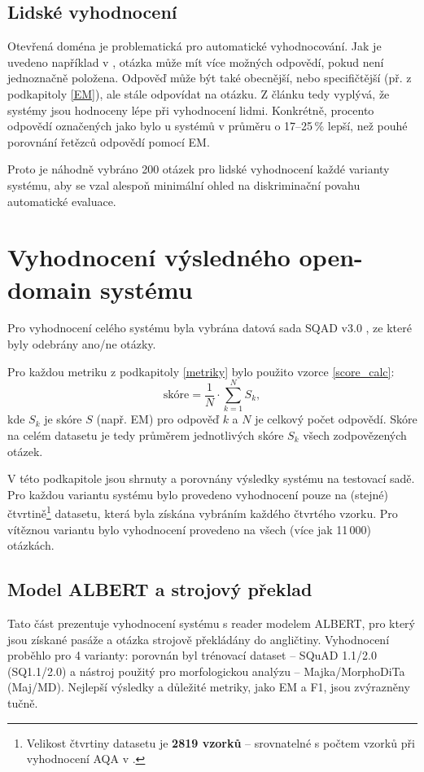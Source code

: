 \subsection{Lidské vyhodnocení}
Otevřená doména je problematická pro automatické vyhodnocování. Jak je uvedeno například v \cite{min2021neurips}, otázka může mít více možných odpovědí, pokud není jednoznačně položena. Odpověď může být také obecnější, nebo specifičtější (př. z podkapitoly \ref{EM}), ale stále odpovídat na otázku. Z článku \cite{min2021neurips} tedy vyplývá, že systémy jsou hodnoceny lépe při vyhodnocení lidmi. Konkrétně, procento odpovědí označených jako  bylo u systémů v průměru o 17--25\,\% lepší, než pouhé porovnání řetězců odpovědí pomocí EM.\par
Proto je náhodně vybráno 200 otázek pro lidské vyhodnocení každé varianty systému, aby se vzal alespoň minimální ohled na diskriminační povahu automatické evaluace.

\section{Vyhodnocení výsledného open-domain systému}
Pro vyhodnocení celého systému byla vybrána datová sada SQAD v3.0 \cite{sqad}, ze které byly odebrány ano/ne otázky.\par
Pro každou metriku z podkapitoly \ref{metriky} bylo použito vzorce \ref{score_calc}:
\begin{equation}
    \label{score_calc}
    \text{skóre} = \frac{1}{N}\cdot \sum^N_{k=1} S_k,
\end{equation}
kde $S_k$ je skóre $S$ (např. EM) pro odpověď $k$ a $N$ je celkový počet odpovědí. Skóre na celém datasetu je tedy průměrem jednotlivých skóre $S_k$ všech zodpovězených otázek.\par
V této podkapitole jsou shrnuty a porovnány výsledky systému na testovací sadě. Pro každou variantu systému bylo provedeno vyhodnocení pouze na (stejné) čtvrtině\footnote{Velikost čtvrtiny datasetu je \textbf{2819 vzorků} -- srovnatelné s počtem vzorků při vyhodnocení AQA v \cite{aqa2018}.} datasetu, která byla získána vybráním každého čtvrtého vzorku. Pro vítěznou variantu bylo vyhodnocení provedeno na všech (více jak 11\,000) otázkách.

\subsection{Model ALBERT a strojový překlad}
\label{albert_eval}
Tato část prezentuje vyhodnocení systému s reader modelem ALBERT, pro který jsou získané pasáže a otázka strojově překládány do angličtiny. Vyhodnocení proběhlo pro 4 varianty: porovnán byl trénovací dataset -- SQuAD 1.1/2.0 (SQ1.1/2.0) a nástroj použitý pro morfologickou analýzu -- Majka/MorphoDiTa (Maj/MD). Nejlepší výsledky a důležité metriky, jako EM a F1, jsou zvýrazněny tučně.

